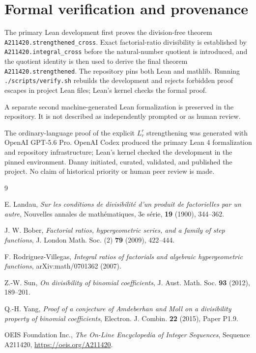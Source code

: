 \documentclass[11pt,a4paper]{amsart}
\begin{document}
\section{Formal verification and provenance}

The primary Lean development first proves the division-free theorem
\nolinkurl{A211420.strengthened_cross}. Exact factorial-ratio divisibility is
established by \nolinkurl{A211420.integral_cross} before the natural-number
quotient is introduced, and the quotient identity is then used to derive the
final theorem \nolinkurl{A211420.strengthened}. The repository pins both Lean and
mathlib. Running \texttt{./scripts/verify.sh} rebuilds the development and
rejects forbidden proof escapes in project Lean files; Lean's kernel checks
the formal proof.

A separate second machine-generated Lean formalization is preserved in the
repository. It is not described as independently prompted or as human review.

The ordinary-language proof of the explicit $L_r^r$ strengthening was
generated with OpenAI GPT-5.6 Pro. OpenAI Codex produced the primary Lean 4
formalization and repository infrastructure; Lean's kernel checked the
development in the pinned environment. Danny initiated, curated, validated,
and published the project. No claim of historical priority or human peer
review is made.

\begin{thebibliography}{9}

E. Landau,
\emph{Sur les conditions de divisibilit\'e d'un produit de factorielles par
un autre},
Nouvelles annales de math\'ematiques, 3e s\'erie, \textbf{19} (1900),
344--362.

J. W. Bober,
\emph{Factorial ratios, hypergeometric series, and a family of step
functions},
J. London Math. Soc. (2) \textbf{79} (2009), 422--444.

F. Rodriguez-Villegas,
\emph{Integral ratios of factorials and algebraic hypergeometric functions},
arXiv:math/0701362 (2007).

Z.-W. Sun,
\emph{On divisibility of binomial coefficients},
J. Aust. Math. Soc. \textbf{93} (2012), 189--201.

Q.-H. Yang,
\emph{Proof of a conjecture of Amdeberhan and Moll on a divisibility
property of binomial coefficients},
Electron. J. Combin. \textbf{22} (2015), Paper P1.9.

OEIS Foundation Inc.,
\emph{The On-Line Encyclopedia of Integer Sequences},
Sequence A211420, \url{https://oeis.org/A211420}.

\end{thebibliography}
\end{document}
